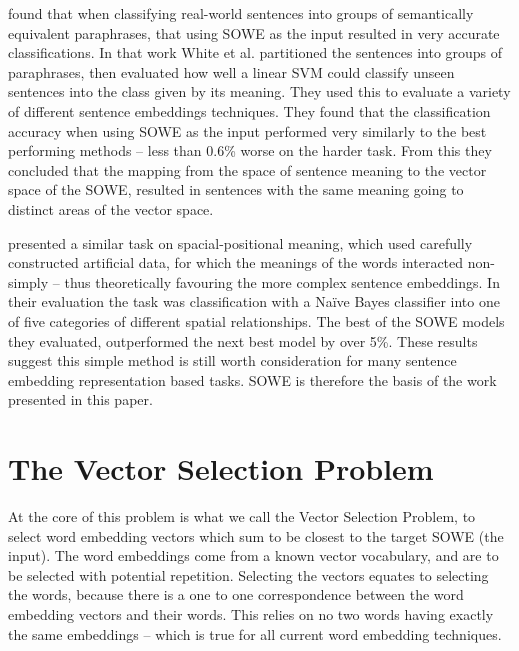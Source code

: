 \documentclass{llncs}
\begin{document}
\textcite{White2015SentVecMeaning} found that when classifying real-world sentences into groups of semantically equivalent paraphrases, that using SOWE as the input resulted in very accurate classifications. In that work White et al. partitioned the sentences into groups of paraphrases, then evaluated how well a linear SVM could classify unseen sentences into the class given by its meaning. They used this to evaluate a  variety of different sentence embeddings techniques. They found that the classification accuracy when using SOWE as the input performed very similarly to the best performing methods -- less than 0.6\% worse on the harder task. From this they concluded that the mapping from the space of sentence meaning to the vector space of the SOWE, resulted in sentences with the same meaning going to distinct areas of the vector space.

\textcite{RitterPosition} presented a similar task on spacial-positional meaning, which used carefully constructed artificial data, for which the meanings of the words interacted non-simply -- thus theoretically favouring the more complex sentence embeddings. In their evaluation the task was classification with a Na{\"i}ve Bayes classifier into one of five categories of different spatial relationships. The best of the SOWE models they evaluated, outperformed the next best model by over 5\%. These results suggest this simple method is still worth consideration for many sentence embedding representation based tasks. SOWE is therefore the basis of the work presented in this paper.

\section{The Vector Selection Problem}\label{framework}

At the core of this problem is what we call the Vector Selection Problem, to select word embedding vectors which sum to be closest to the target SOWE (the input). The word embeddings come from a known vector vocabulary, and are to be selected with potential repetition.
Selecting the vectors equates to selecting the words, because there is a one to one correspondence between the word embedding vectors and their words. This relies on no two words having exactly the same embeddings -- which is true for all current word embedding techniques.
\end{document}
